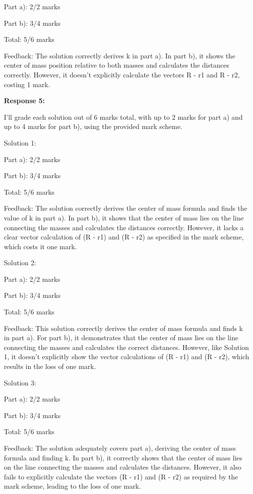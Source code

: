 \documentclass[a4paper,11pt]{article}
\begin{document}
Part a): 2/2 marks

Part b): 3/4 marks

Total: 5/6 marks

Feedback: The solution correctly derives k in part a). In part b), it shows the center of mass position relative to both masses and calculates the distances correctly. However, it doesn't explicitly calculate the vectors R - r1 and R - r2, costing 1 mark.

\bigskip
\textbf{Response 5:}

I'll grade each solution out of 6 marks total, with up to 2 marks for part a) and up to 4 marks for part b), using the provided mark scheme.

Solution 1:

Part a): 2/2 marks

Part b): 3/4 marks

Total: 5/6 marks

Feedback: The solution correctly derives the center of mass formula and finds the value of k in part a). In part b), it shows that the center of mass lies on the line connecting the masses and calculates the distances correctly. However, it lacks a clear vector calculation of (R - r1) and (R - r2) as specified in the mark scheme, which costs it one mark.

Solution 2:

Part a): 2/2 marks

Part b): 3/4 marks

Total: 5/6 marks

Feedback: This solution correctly derives the center of mass formula and finds k in part a). For part b), it demonstrates that the center of mass lies on the line connecting the masses and calculates the correct distances. However, like Solution 1, it doesn't explicitly show the vector calculations of (R - r1) and (R - r2), which results in the loss of one mark.

Solution 3:

Part a): 2/2 marks

Part b): 3/4 marks

Total: 5/6 marks

Feedback: The solution adequately covers part a), deriving the center of mass formula and finding k. In part b), it correctly shows that the center of mass lies on the line connecting the masses and calculates the distances. However, it also fails to explicitly calculate the vectors (R - r1) and (R - r2) as required by the mark scheme, leading to the loss of one mark.
\end{document}
